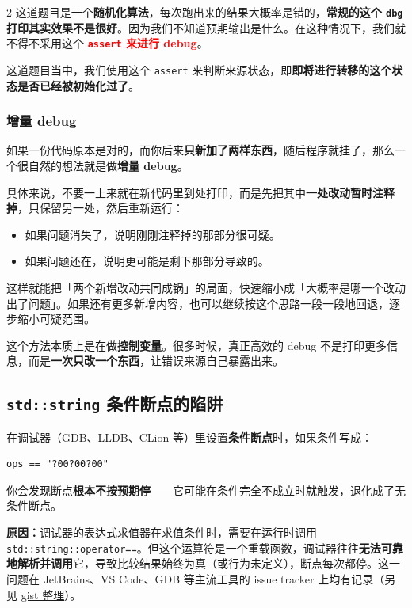\begin{multicols*}{2}
		这道题目是一个\textbf{随机化算法}，每次跑出来的结果大概率是错的，\textbf{常规的这个 \texttt{dbg} 打印其实效果不是很好}。因为我们不知道预期输出是什么。在这种情况下，我们就不得不采用这个 \textcolor{red}{\textbf{\texttt{assert} 来进行 debug}}。

		这道题目当中，我们使用这个 \texttt{assert} 来判断来源状态，即\textbf{即将进行转移的这个状态是否已经被初始化过了}。

		\subsubsection{增量 debug}

		如果一份代码原本是对的，而你后来\textbf{只新加了两样东西}，随后程序就挂了，那么一个很自然的想法就是做\textbf{增量 debug}。

		具体来说，不要一上来就在新代码里到处打印，而是先把其中\textbf{一处改动暂时注释掉}，只保留另一处，然后重新运行：

		\begin{itemize}
			\item 如果问题消失了，说明刚刚注释掉的那部分很可疑。
			\item 如果问题还在，说明更可能是剩下那部分导致的。
		\end{itemize}

		这样就能把「两个新增改动共同成锅」的局面，快速缩小成「大概率是哪一个改动出了问题」。如果还有更多新增内容，也可以继续按这个思路一段一段地回退，逐步缩小可疑范围。

		这个方法本质上是在做\textbf{控制变量}。很多时候，真正高效的 debug 不是打印更多信息，而是\textbf{一次只改一个东西}，让错误来源自己暴露出来。

		\subsection{\texttt{std::string} 条件断点的陷阱}

		在调试器（GDB、LLDB、CLion 等）里设置\textbf{条件断点}时，如果条件写成：

		\begin{verbatim}
ops == "?00?00?00"
		\end{verbatim}

		你会发现断点\textbf{根本不按预期停}——它可能在条件完全不成立时就触发，退化成了无条件断点。

		\textbf{原因：}调试器的表达式求值器在求值条件时，需要在运行时调用 \texttt{std::string::operator==}。但这个运算符是一个重载函数，调试器往往\textbf{无法可靠地解析并调用}它，导致比较结果始终为真（或行为未定义），断点每次都停。这一问题在 JetBrains、VS Code、GDB 等主流工具的 issue tracker 上均有记录（另见 \href{https://gist.github.com/znzryb/9b23d0b1db7bd9f831c0a5f96f41f090}{gist 整理}）。


\end{multicols*}
